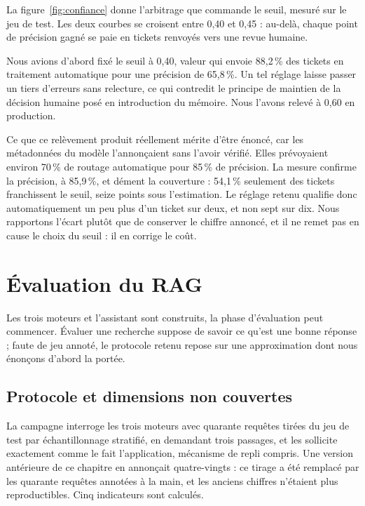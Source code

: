La figure~\ref{fig:confiance} donne l'arbitrage que commande le seuil, mesuré sur le jeu de test.
Les deux courbes se croisent entre 0,40 et 0,45 : au-delà, chaque point de précision gagné se paie
en tickets renvoyés vers une revue humaine.

Nous avions d'abord fixé le seuil à 0,40, valeur qui envoie 88,2\,\% des tickets en traitement
automatique pour une précision de 65,8\,\%. Un tel réglage laisse passer un tiers d'erreurs sans
relecture, ce qui contredit le principe de maintien de la décision humaine posé en introduction du
mémoire. Nous l'avons relevé à 0,60 en production.

Ce que ce relèvement produit réellement mérite d'être énoncé, car les métadonnées du modèle
l'annonçaient sans l'avoir vérifié. Elles prévoyaient environ 70\,\% de routage automatique pour
85\,\% de précision. La mesure confirme la précision, à 85,9\,\%, et dément la couverture : 54,1\,\%
seulement des tickets franchissent le seuil, seize points sous l'estimation. Le réglage retenu
qualifie donc automatiquement un peu plus d'un ticket sur deux, et non sept sur dix. Nous rapportons
l'écart plutôt que de conserver le chiffre annoncé, et il ne remet pas en cause le choix du seuil :
il en corrige le coût.

\section{Évaluation du RAG}

\label{sec:eval5}

Les trois moteurs et l'assistant sont construits, la phase d'évaluation peut commencer. Évaluer une
recherche suppose de savoir ce qu'est une bonne réponse ; faute de jeu annoté, le protocole retenu
repose sur une approximation dont nous énonçons d'abord la portée.

\subsection{Protocole et dimensions non couvertes}

La campagne interroge les trois moteurs avec quarante requêtes tirées du jeu de test par
échantillonnage stratifié, en demandant trois passages, et les sollicite exactement comme le fait
l'application, mécanisme de repli compris. Une version antérieure de ce chapitre en annonçait
quatre-vingts : ce tirage a été remplacé par les quarante requêtes annotées à la main, et les
anciens chiffres n'étaient plus reproductibles. Cinq indicateurs sont calculés.

